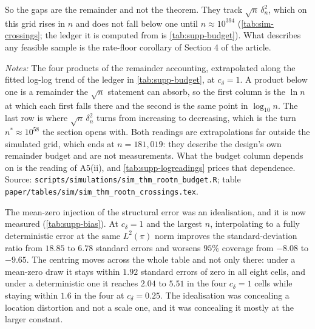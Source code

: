 \documentclass[
  12pt]{article}
\newcommand{\1}[1]{\mathds{1}\left[#1\right]}
\theoremstyle{plain}
\theoremstyle{definition}
\theoremstyle{definition}
\theoremstyle{remark}
\begin{document}
So the gaps are the remainder and not the theorem. They track
$\sqrt n\,\delta_n^{2}$, which on this grid rises in $n$ and does not fall below
one until $n\approx10^{394}$ (\cref{tab:sim-crossings}; the ledger it is computed
from is \cref{tab:supp-budget}). What describes any
feasible sample is the rate-floor corollary of Section 4 of the article.

\begin{table}[!htbp]
\centering
\begin{threeparttable}
\caption{Where each Step-4 product falls below one, and where the leading one
turns}
\label{tab:sim-crossings}
\footnotesize

\begin{tablenotes}\footnotesize
\item \textit{Notes:} The four products of the remainder accounting, extrapolated
along the fitted log-log trend of the ledger in \cref{tab:supp-budget}, at
$c_\delta=1$. A product below one is a remainder the $\sqrt n$ statement can
absorb, so the first column is the $\ln n$ at which each first falls there and
the second is the same point in $\log_{10}n$. The last row is where
$\sqrt n\,\delta_n^{2}$ turns from increasing to decreasing, which is the turn
$n^{\ast}\approx10^{58}$ the section opens with. Both readings are
extrapolations far outside the simulated grid, which ends at $n=181{,}019$: they
describe the design's own remainder budget and are not measurements. What the
budget column depends on is the reading of A5(ii), and \cref{tab:supp-logreadings}
prices that dependence. Source:
\texttt{scripts/simulations/sim\_thm\_rootn\_budget.R}; table
\texttt{paper/tables/sim/sim\_thm\_rootn\_crossings.tex}.
\end{tablenotes}
\end{threeparttable}
\end{table}

The mean-zero injection of the structural error was an idealisation, and it is
now measured (\cref{tab:supp-bias}). At $c_\delta=1$ and the largest $n$,
interpolating to a fully deterministic error at the same $L^{2}(\pi)$ norm
improves the standard-deviation ratio from $18.85$ to $6.78$ standard errors and
worsens $95\%$ coverage from $-8.08$ to $-9.65$. The centring moves across the
whole table and not only there: under a mean-zero draw it stays within $1.92$
standard errors of zero in all eight cells, and under a deterministic one it
reaches $2.04$ to $5.51$ in the four $c_\delta=1$ cells while staying within
$1.6$ in the four at $c_\delta=0.25$. The idealisation was concealing a location
distortion and not a scale one, and it was concealing it mostly at the larger
constant.
\end{document}
